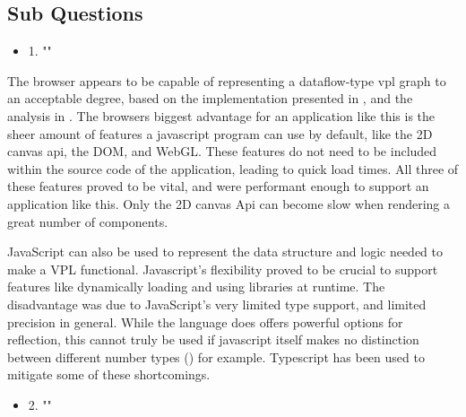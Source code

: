 \subsection*{Sub Questions}

\begin{itemize}[ ]
  \item 1. "\mySubRQOne"
\end{itemize}

The browser appears to be capable of representing a dataflow-type vpl graph to an acceptable degree, 
based on the implementation presented in , and the analysis in .
The browsers biggest advantage for an application like this is the sheer amount of features a javascript program can use by default, like the 2D canvas api, the DOM, and WebGL. 
These features do not need to be included within the source code of the application, leading to quick load times. 
All three of these features proved to be vital, and were performant enough to support an application like this. 
Only the 2D canvas Api can become slow when rendering a great number of components. 

JavaScript can also be used to represent the data structure and logic needed to make a VPL functional. 
Javascript's flexibility proved to be crucial to support features like dynamically loading and using libraries at runtime. 
The disadvantage was due to JavaScript's very limited type support, and limited precision in general. 
While the language does offers powerful options for reflection, this cannot truly be used if javascript itself makes no distinction between different number types () for example. 
Typescript has been used to mitigate some of these shortcomings.  

\begin{itemize}[ ]
  \item 2. "\mySubRQTwo"
\end{itemize}


